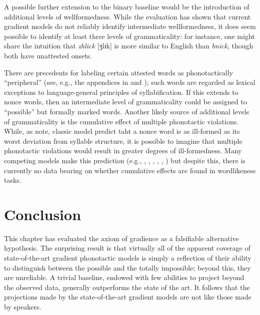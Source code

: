 A possible further extension to the binary baseline would be the introduction of additional levels of wellformedness. While the evaluation has shown that current gradient models do not reliably identify intermediate wellformedness, it does seem possible to identify at least three levels of grammaticality: for instance, one might share the intuition that \emph{zhlick} [ʒlɪk] is more similar to English than \emph{bnick}, though both have unattested onsets. 

There are precedents for labeling certain attested words as phonotactically ``peripheral'' (see, e.g., the appendices in \citealt{Myers1987} and \citealt{Borowsky1989}); such words are regarded as lexical exceptions to language-general principles of syllabification. If this extends to nonce words, then an intermediate level of grammaticality could be assigned to ``possible'' but formally marked words. Another likely source of additional levels of grammaticality is the cumulative effect of multiple phonotactic violations. While, as \citet{Coleman1997} note, classic model predict taht a nonce word is as ill-formed as its worst deviation from syllable structure, 
it is possible to imagine that multiple phonotactic violations would result in greater degrees of ill-formedness. Many competing models make this prediction (e.g., \citealt{Legendre1990}, \citealt{Levelt2000}, \citealt{Goldwater2003}, \citealt{Jager2007}, \citealt{Albright2008}, \citealt{Pater2009b}) but despite this, there is currently no data bearing on whether cumulative effects are found in wordlikeness tasks.

\section{Conclusion}

This chapter has evaluated the axiom of gradience as a falsifiable alternative hypothesis. The surprising result is that virtually all of the apparent coverage of state-of-the-art gradient phonotactic models is simply a reflection of their ability to distinguish between the possible and the totally impossible; beyond this, they are unreliable. A trivial baseline, endowed with few abilities to project beyond the observed data, generally outperforms the state of the art. It follows that the projections made by the state-of-the-art gradient models are not like those made by speakers.

